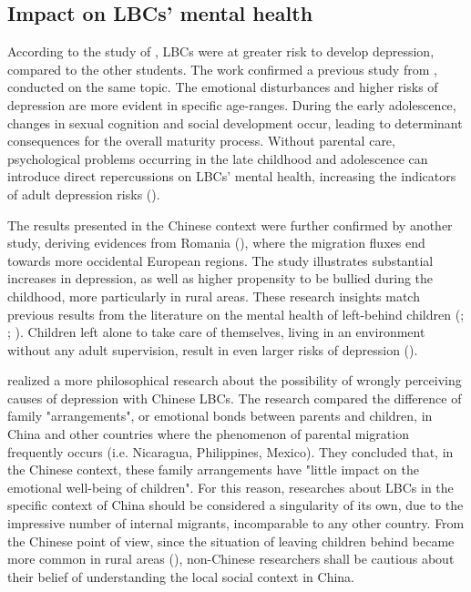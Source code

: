 \subsection{Impact on LBCs' mental health}
\label{subsec:impact_mental_health}

According to the study of \textcite{he2012depression}, LBCs were at greater risk to develop depression, compared to the other students. The work confirmed a previous study from \textcite{fan2010emotional}, conducted on the same topic. The emotional disturbances and higher risks of depression are more evident in specific age-ranges. During the early adolescence, changes in sexual cognition and social development occur, leading to determinant consequences for the overall maturity process. Without parental care, psychological problems occurring in the late childhood and adolescence can introduce direct repercussions on LBCs' mental health, increasing the indicators of adult depression risks  (\cite{kosterman2010assessment}).

The results presented in the Chinese context were further confirmed by another study, deriving evidences from Romania (\cite{botezat2014impact}), where the migration fluxes end towards more occidental European regions. The study illustrates substantial increases in depression, as well as higher propensity to be bullied during the childhood, more particularly in rural areas. These research insights match previous results from the literature on the mental health of left-behind children (\cite{gibson2011happens}; \cite{dreby2007children}; \cite{mazzucato2011transnational}). Children left alone to take care of themselves, living in an environment without any adult supervision, result in even larger risks of depression (\cite{lahaie2009work}).

\textcite{ren2016consequences} realized a more philosophical research about the possibility of wrongly perceiving causes of depression with Chinese LBCs. The research compared the difference of family "arrangements", or emotional bonds between parents and children, in China and other countries where the phenomenon of parental migration frequently occurs (i.e. Nicaragua, Philippines, Mexico). They concluded that, in the Chinese context, these family arrangements have "little impact on the emotional well-being of children". For this reason, researches about LBCs in the specific context of China should be considered a singularity of its own, due to the impressive number of internal migrants, incomparable to any other country. From the Chinese point of view, since the situation of leaving children behind became more common in rural areas (\cite{hao2006discussion}), non-Chinese researchers shall be cautious about their belief of understanding the local social context in China.



